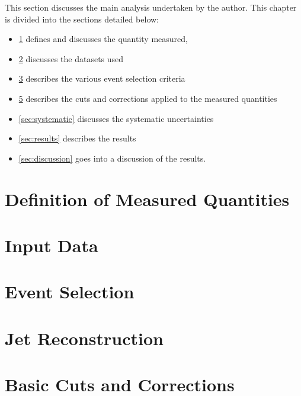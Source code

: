
This section discusses the main analysis undertaken by the author. This chapter is divided into the sections detailed below:

\begin{itemize}
\item \ref{sec:trkjet_corr_measurement} defines and discusses the quantity measured,
\item \ref{sec:used_data} discusses the datasets used
\item \ref{sec:event_selection} describes the various event selection criteria
\item \ref{sec:cuts_corrections} describes the cuts and corrections applied to the measured quantities
\item \ref{sec:systematic} discusses the systematic uncertainties
\item \ref{sec:results} describes the results
\item \ref{sec:discussion} goes into a discussion of the results. 
\end{itemize}

\section{Definition of Measured Quantities}
\label{sec:trkjet_corr_measurement}


\section{Input Data}
\label{sec:used_data}


\section{Event Selection }
\label{sec:event_selection}


\section{Jet Reconstruction}
\label{sec:reconstruction}


\section{Basic Cuts and Corrections}
\label{sec:cuts_corrections}


